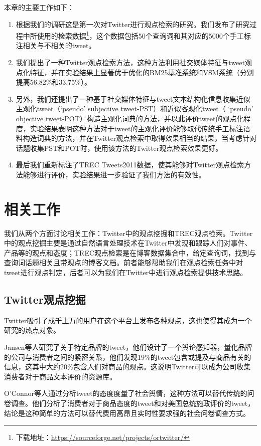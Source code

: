 本章的主要工作如下：
\begin{enumerate}
\item 根据我们的调研这是第一次对Twitter进行观点检索的研究。我们发布了研究过程中所使用的检索数据\footnote{下载地址：\url{https://sourceforge.net/projects/ortwitter/}}，这个数据包括50个查询词和其对应的5000个手工标注相关与不相关的tweet。
\item 我们提出了一种Twitter观点检索方法，这种方法利用社交媒体特征与tweet观点化特征，并在实验结果上显著优于优化的BM25基准系统和VSM系统（分别提高56.82\%和33.75\%）。
\item 另外，我们还提出了一种基于社交媒体特征与tweet文本结构化信息收集近似主观化tweet（`pseudo' subjective tweet-PST）和近似客观化tweet（ `pseudo' objective tweet-POT）构造主观化词典的方法，并以此评价tweet的观点化程度，实验结果表明这种方法对于tweet的主观化评价能够取代传统手工标注语料构造词典的方法，并在Twitter观点检索中取得效果相当的结果，当考虑针对话题收集PST和POT时，使用该方法的Twitter观点检索效果更好。
\item 最后我们重新标注了TREC Tweets2011数据，使其能够对Twitter观点检索方法能够进行评价，实验结果进一步验证了我们方法的有效性。
\end{enumerate}

\section{相关工作}
我们从两个方面讨论相关工作：Twitter中的观点挖掘和TREC观点检索。Twitter中的观点挖掘主要是通过自然语言处理技术在Twitter中发现和跟踪人们对事件、产品等的观点和态度；TREC观点检索是在博客数据集合中，给定查询词，找到与查询词话题相关且带观点的博客文档。前者能够帮助我们在观点检索任务中对tweet进行观点判定，后者可以为我们在Twitter中进行观点检索提供技术思路。

\subsection{Twitter观点挖掘}
Twitter吸引了成千上万的用户在这个平台上发布各种观点，这也使得其成为一个研究的热点对象。

Jansen等人研究了关于特定品牌的tweet，他们设计了一个舆论感知器，量化品牌的公司与消费者之间的紧密关系，他们发现19\%的tweet包含或提及与商品有关的信息，这其中大约20\%包含人们对商品的观点。这说明Twitter可以成为公司收集消费者对于商品文本评价的资源库。

O'Connor等人通过分析tweet的态度度量了社会舆情，这种方法可以替代传统的问卷调查。他们分析了消费者对于商品态度的tweet和对美国总统施政评价的tweet，结论是这种简单的方法可以替代费用高昂且实时性要求强的社会问卷调查方式。

